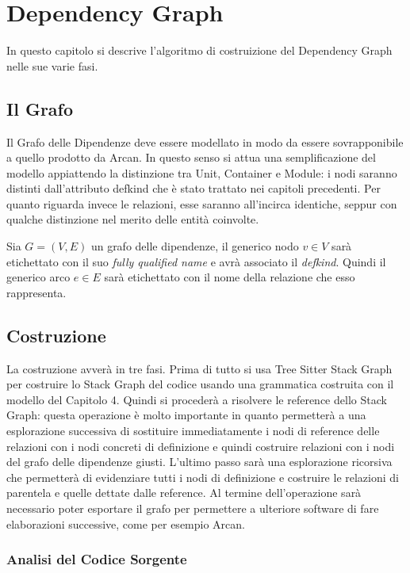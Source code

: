 \chapter{Dependency Graph}

In questo capitolo si descrive l'algoritmo di costruizione del Dependency Graph nelle sue varie fasi.

\section{Il Grafo}

Il Grafo delle Dipendenze deve essere modellato in modo da essere sovrapponibile a quello prodotto da Arcan.
In questo senso si attua una semplificazione del modello appiattendo la distinzione tra Unit, Container e Module: i nodi saranno distinti dall'attributo defkind che \`e stato trattato nei capitoli precedenti.
Per quanto riguarda invece le relazioni, esse saranno all'incirca identiche, seppur con qualche distinzione nel merito delle entit\`a coinvolte.

Sia $G = (V, E)$ un grafo delle dipendenze, il generico nodo $v \in V$ sar\`a etichettato con il suo \emph{fully qualified name} e avr\`a associato il \emph{defkind}.
Quindi il generico arco $e \in E$ sar\`a etichettato con il nome della relazione che esso rappresenta.

\section{Costruzione}

La costruzione avver\`a in tre fasi.
Prima di tutto si usa Tree Sitter Stack Graph per costruire lo Stack Graph del codice usando una grammatica costruita con il modello del Capitolo 4.
Quindi si proceder\`a a risolvere le reference dello Stack Graph: questa operazione \`e molto importante in quanto permetter\`a a una esplorazione successiva di sostituire immediatamente i nodi di reference delle relazioni con i nodi concreti di definizione e quindi costruire relazioni con i nodi del grafo delle dipendenze giusti.
L'ultimo passo sar\`a una esplorazione ricorsiva che permetter\`a di evidenziare tutti i nodi di definizione e costruire le relazioni di parentela e quelle dettate dalle reference.
Al termine dell'operazione sar\`a necessario poter esportare il grafo per permettere a ulteriore software di fare elaborazioni successive, come per esempio Arcan.

\subsection{Analisi del Codice Sorgente}

